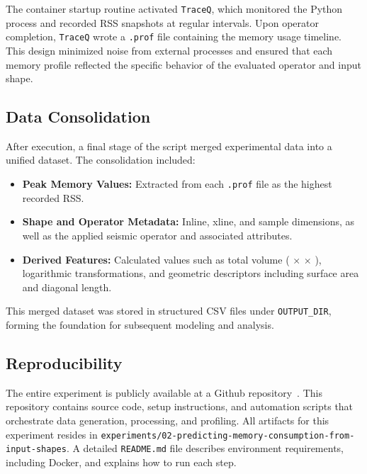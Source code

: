 The container startup routine activated \texttt{TraceQ}, which monitored the Python process and recorded \ac{RSS} snapshots at regular intervals.
Upon operator completion, \texttt{TraceQ} wrote a \texttt{.prof} file containing the memory usage timeline.
This design minimized noise from external processes and ensured that each memory profile reflected the specific behavior of the evaluated operator and input shape.

\subsection{Data Consolidation}
\label{subsec:data-consolidation}

After execution, a final stage of the script merged experimental data into a unified dataset.
The consolidation included:

\begin{itemize}
    \item \textbf{Peak Memory Values:} Extracted from each \texttt{.prof} file as the highest recorded \ac{RSS}.
    \item \textbf{Shape and Operator Metadata:} Inline, xline, and sample dimensions, as well as the applied seismic operator and associated attributes.
    \item \textbf{Derived Features:} Calculated values such as total volume ( $\times$  $\times$ ), logarithmic transformations, and geometric descriptors including surface area and diagonal length.
\end{itemize}

This merged dataset was stored in structured \ac{CSV} files under \texttt{OUTPUT\_DIR}, forming the foundation for subsequent modeling and analysis.

\subsection{Reproducibility}
\label{subsec:reproducibility}

The entire experiment is publicly available at a \ac{Github} repository~\cite{delucca2025experiment2}.
This repository contains source code, setup instructions, and automation scripts that orchestrate data generation, processing, and profiling.
All artifacts for this experiment resides in \texttt{experiments/02-predicting-memory-consumption-from-input-shapes}.
A detailed \texttt{README.md} file describes environment requirements, including Docker, and explains how to run each step.


